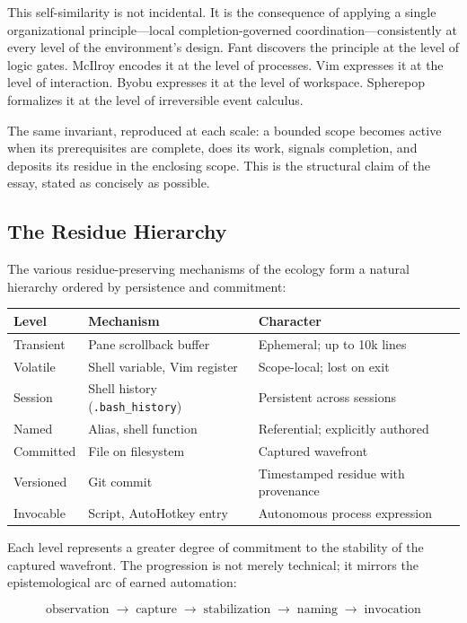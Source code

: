 \documentclass[12pt, a4paper]{article}
\begin{document}
This self-similarity is not incidental. It is the consequence
of applying a single organizational principle---local
completion-governed coordination---consistently at every level
of the environment's design. Fant discovers the principle at
the level of logic gates. McIlroy encodes it at the level of
processes. Vim expresses it at the level of interaction. Byobu
expresses it at the level of workspace. Spherepop formalizes
it at the level of irreversible event calculus.

The same invariant, reproduced at each scale: a bounded scope
becomes active when its prerequisites are complete, does its
work, signals completion, and deposits its residue in the
enclosing scope. This is the structural claim of the essay,
stated as concisely as possible.

\subsection{The Residue Hierarchy}

The various residue-preserving mechanisms of the ecology form
a natural hierarchy ordered by persistence and commitment:

\begin{center}
\begin{tabular}{lll}
\textbf{Level} & \textbf{Mechanism} & \textbf{Character} \\
\hline
Transient & Pane scrollback buffer & Ephemeral; up to 10k lines \\
Volatile & Shell variable, Vim register & Scope-local; lost on exit \\
Session & Shell history (\texttt{.bash\_history}) & Persistent across sessions \\
Named & Alias, shell function & Referential; explicitly authored \\
Committed & File on filesystem & Captured wavefront \\
Versioned & Git commit & Timestamped residue with provenance \\
Invocable & Script, AutoHotkey entry & Autonomous process expression \\
\end{tabular}
\end{center}

Each level represents a greater degree of commitment to the
stability of the captured wavefront. The progression is not
merely technical; it mirrors the epistemological arc of earned
automation:

\[
\text{observation}
\;\to\;
\text{capture}
\;\to\;
\text{stabilization}
\;\to\;
\text{naming}
\;\to\;
\text{invocation}
\]
\end{document}
